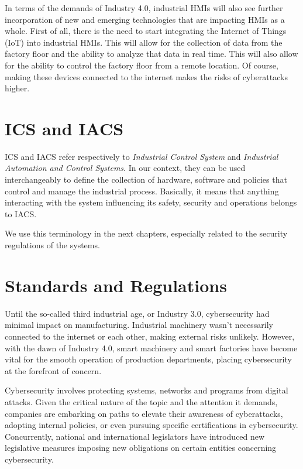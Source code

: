 In terms of the demands of Industry 4.0, industrial HMIs will also see further incorporation of new and emerging technologies that are impacting HMIs as a whole. First of all, there is the need to start integrating the Internet of Things (IoT) into industrial HMIs. This will allow for the collection of data from the factory floor and the ability to analyze that data in real time. This will also allow for the ability to control the factory floor from a remote location. Of course, making these devices connected to the internet makes the risks of cyberattacks higher.

\section{ICS and IACS}

ICS and IACS refer respectively to \textit{Industrial Control System} and \textit{Industrial Automation and Control Systems}. In our context, they can be used interchangeably to define the collection of hardware, software and policies that control and manage the industrial process. Basically, it means that anything interacting with the system influencing its safety, security and operations belongs to IACS.~\cite{ics-or-iacs}

We use this terminology in the next chapters, especially related to the security regulations of the systems.

\section{Standards and Regulations}
Until the so-called third industrial age, or Industry 3.0, cybersecurity had minimal impact on manufacturing. Industrial machinery wasn't necessarily connected to the internet or each other, making external risks unlikely. However, with the dawn of Industry 4.0, smart machinery and smart factories have become vital for the smooth operation of production departments, placing cybersecurity at the forefront of concern.

Cybersecurity involves protecting systems, networks and programs from digital attacks. Given the critical nature of the topic and the attention it demands, companies are embarking on paths to elevate their awareness of cyberattacks, adopting internal policies, or even pursuing specific certifications in cybersecurity. Concurrently, national and international legislators have introduced new legislative measures imposing new obligations on certain entities concerning cybersecurity.

